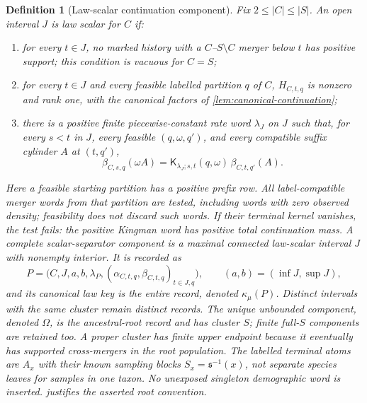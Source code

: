 \documentclass[11pt]{article}
\newtheorem{definition}[theorem]{Definition}
\begin{document}
\begin{definition}[Law-scalar continuation component]
\label{def:law-scalar-component}
Fix $2\le |C|\le |S|$.  An open interval $J$ is \emph{law scalar for $C$} if:
\begin{enumerate}[label=(S\arabic*)]
\item for every $t\in J$, no marked history with a $C$--$S\setminus C$ merger below $t$ has positive support; this condition is vacuous for $C=S$;
\item for every $t\in J$ and every feasible labelled partition $q$ of $C$, $H_{C,t,q}$ is nonzero and rank one, with the canonical factors of \cref{lem:canonical-continuation};
\item there is a positive finite piecewise-constant rate word $\lambda_J$ on $J$ such that, for every $s<t$ in $J$, every feasible $(q,\omega,q')$, and every compatible suffix cylinder $A$ at $(t,q')$,
\begin{equation}
\beta_{C,s,q}(\omega A)
=\mathsf K_{\lambda_J;s,t}(q,\omega)\,
\beta_{C,t,q'}(A).
\label{eq:continuation-cocycle}
\end{equation}
\end{enumerate}
Here a feasible starting partition has a positive prefix row.  All label-compatible merger words from that partition are tested, including words with zero observed density; feasibility does not discard such words.  If their terminal kernel vanishes, the test fails: the positive Kingman word has positive total continuation mass.
A \emph{complete scalar-separator component} is a maximal connected law-scalar interval $J$ with nonempty interior.  It is recorded as
\[
P=\bigl(C,J,a,b,\lambda_P,
(\alpha_{C,t,q},\beta_{C,t,q})_{t\in J,q}\bigr),
\qquad (a,b)=(\inf J,\sup J),
\]
and its canonical law key is the entire record, denoted $\kappa_\mu(P)$.  Distinct intervals with the same cluster remain distinct records.  The unique unbounded component, denoted $\Omega$, is the ancestral-root record and has cluster $S$; finite full-$S$ components are retained too.  A proper cluster has finite upper endpoint because it eventually has supported cross-mergers in the root population.  The labelled terminal atoms are $A_x$ with their known sampling blocks $S_x=\mathfrak s^{-1}(x)$, not separate species leaves for samples in one taxon.  No unexposed singleton demographic word is inserted.   justifies the asserted root convention.
\end{definition}
\end{document}

